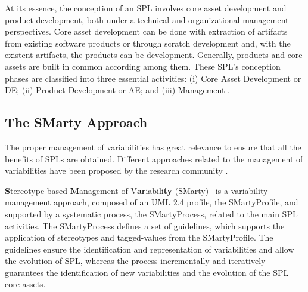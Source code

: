 At its essence, the conception of an SPL involves core asset development and product development, both under a technical and organizational management perspectives. Core asset development can be done with extraction of artifacts from existing software products or through scratch development and, with the existent artifacts, the products can be development. Generally, products and core assets are built in common according among them. These SPL's conception phases are classified into three essential activities: (i) Core Asset Development or DE; (ii) Product Development or AE; and (iii) Management \cite{bockle05, vanderlinden07}.

\subsection{The SMarty Approach}

The proper management of variabilities has great relevance to ensure that all the benefits of SPLs are obtained. Different approaches related to the management of variabilities have been proposed by the research community  \cite{chen11, capilla13}.  



\textbf{S}tereotype-based \textbf{M}anagement of V\textbf{ar}iabili\textbf{ty} (SMarty)~\cite{oliveirajr10} is a variability management approach, composed of an UML 2.4 profile, the SMartyProfile, and supported by a systematic process, the SMartyProcess, related to the main SPL activities. The SMartyProcess defines a set of guidelines, which supports the application of stereotypes and tagged-values from the SMartyProfile. The guidelines ensure the identification and representation of variabilities and allow the evolution of SPL, whereas the process incrementally and iteratively guarantees the identification of new variabilities and the evolution of the SPL core assets.

